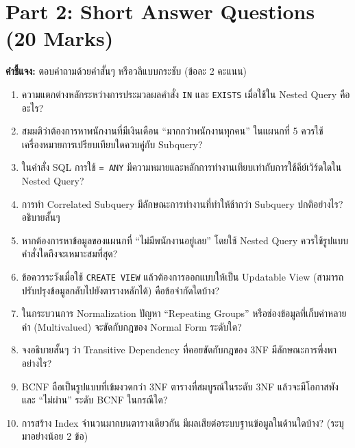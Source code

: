 \documentclass[a4paper,12pt]{article}
\begin{document}
\newpage
\section*{Part 2: Short Answer Questions (20 Marks)}
\textbf{คำชี้แจง:} ตอบคำถามด้วยคำสั้นๆ หรือวลีแบบกระชับ (ข้อละ 2 คะแนน)

\begin{enumerate}[label=\textbf{\arabic*.}]
    \item ความแตกต่างหลักระหว่างการประมวลผลคำสั่ง \texttt{IN} และ \texttt{EXISTS} เมื่อใช้ใน Nested Query คืออะไร?
    \vspace{1.5cm}

    \item สมมติว่าต้องการหาพนักงานที่มีเงินเดือน ``มากกว่าพนักงานทุกคน'' ในแผนกที่ 5 ควรใช้เครื่องหมายการเปรียบเทียบใดควบคู่กับ Subquery?
    \vspace{1.5cm}

    \item ในคำสั่ง SQL การใช้ \texttt{= ANY} มีความหมายและหลักการทำงานเทียบเท่ากับการใช้คีย์เวิร์ดใดใน Nested Query?
    \vspace{1.5cm}

    \item การทำ Correlated Subquery มีลักษณะการทำงานที่ทำให้ช้ากว่า Subquery ปกติอย่างไร? อธิบายสั้นๆ
    \vspace{1.5cm}

    \item หากต้องการหาข้อมูลของแผนกที่ ``ไม่มีพนักงานอยู่เลย'' โดยใช้ Nested Query ควรใช้รูปแบบคำสั่งใดถึงจะเหมาะสมที่สุด?
    \vspace{1.5cm}

    \item ข้อควรระวังเมื่อใช้ \texttt{CREATE VIEW} แล้วต้องการออกแบบให้เป็น Updatable View (สามารถปรับปรุงข้อมูลกลับไปยังตารางหลักได้) คือข้อจำกัดใดบ้าง?
    \vspace{1.5cm}

    \item ในกระบวนการ Normalization ปัญหา ``Repeating Groups'' หรือช่องข้อมูลที่เก็บค่าหลายค่า (Multivalued) จะขัดกับกฎของ Normal Form ระดับใด?
    \vspace{1.5cm}

    \item จงอธิบายสั้นๆ ว่า Transitive Dependency ที่คอยขัดกับกฎของ 3NF มีลักษณะการพึ่งพาอย่างไร?
    \vspace{1.5cm}

    \item BCNF ถือเป็นรูปแบบที่เข้มงวดกว่า 3NF ตารางที่สมบูรณ์ในระดับ 3NF แล้วจะมีโอกาสพังและ ``ไม่ผ่าน'' ระดับ BCNF ในกรณีใด?
    \vspace{2.5cm}

    \item การสร้าง Index จำนวนมากบนตารางเดียวกัน มีผลเสียต่อระบบฐานข้อมูลในด้านใดบ้าง? (ระบุมาอย่างน้อย 2 ข้อ)
    \vspace{2.5cm}
\end{enumerate}
\end{document}
